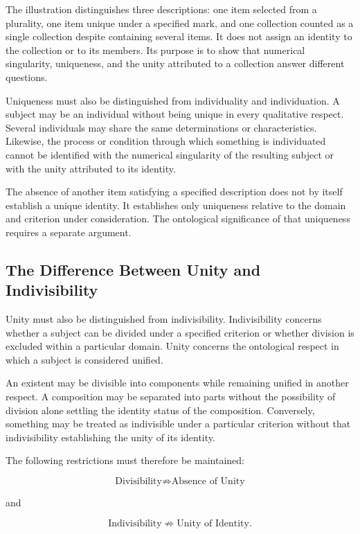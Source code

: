 The illustration distinguishes three descriptions:
one item selected from a plurality, one item
unique under a specified mark, and one collection
counted as a single collection despite containing
several items. It does not assign an identity
to the collection or to its members. Its purpose
is to show that numerical singularity, uniqueness,
and the unity attributed to a collection answer
different questions.

Uniqueness must also be distinguished from
individuality and individuation. A subject may
be an individual without being unique in every
qualitative respect. Several individuals may
share the same determinations or characteristics.
Likewise, the process or condition through
which something is individuated cannot be
identified with the numerical singularity
of the resulting subject or with the unity
attributed to its identity.

The absence of another item satisfying a
specified description does not by itself
establish a unique identity. It establishes
only uniqueness relative to the domain and
criterion under consideration. The ontological
significance of that uniqueness requires
a separate argument.

\subsection{The Difference Between Unity and Indivisibility}

Unity must also be distinguished from
indivisibility. Indivisibility concerns
whether a subject can be divided under
a specified criterion or whether division
is excluded within a particular domain.
Unity concerns the ontological respect
in which a subject is considered unified.

An existent may be divisible into components
while remaining unified in another respect.
A composition may be separated into parts
without the possibility of division alone
settling the identity status of the composition.
Conversely, something may be treated as
indivisible under a particular criterion
without that indivisibility establishing
the unity of its identity.

The following restrictions must therefore
be maintained:

\[
\text{Divisibility}
\not\Rightarrow
\text{Absence of Unity}
\]

and

\[
\text{Indivisibility}
\not\Rightarrow
\text{Unity of Identity}.
\]

